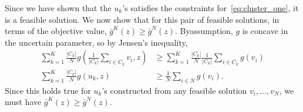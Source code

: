 Since we have shown that the $u_k$'s satisfies the constraints for~\eqref{eq:cluster_one}, it is a feasible solution. We now show that for this pair of feasible solutions, in terms of the objective value, $\bar{g}^K(z) \geq \bar{g}^N(z)$.
Byassumption, $g$ is concave in the uncertain parameter, so by Jensen's inequality,
\begin{align*}
\sum_{k = 1}^K \frac{|C_k|}{N} g \left(\frac{1}{|C_k|}\sum_{i \in C_k}v_i, z\right) &\geq  \sum_{k = 1}^K \frac{|C_k|}{N} \frac{1}{|C_k|}\sum_{i \in C_k} g(v_i)\\
\sum_{k = 1}^K \frac{|C_k|}{N}g(u_k,z) &\geq \frac{1}{N}\sum_{i \in N} g(v_i).
\end{align*}
Since this holds true for $u_k$'s constructed from any feasible solution $v_i, \dots, v_N$, we must have $\bar{g}^K(z) \geq \bar{g}^N(z)$.


